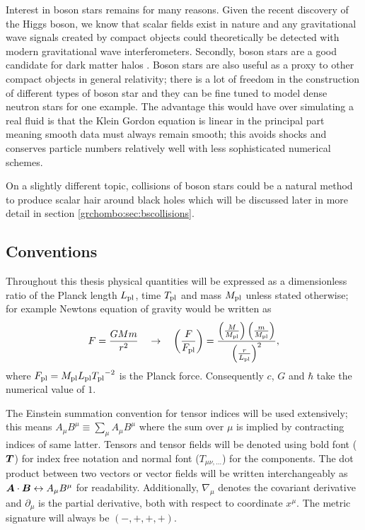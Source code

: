 Interest in boson stars remains for many reasons. Given the recent discovery of the Higgs boson, we know that scalar fields exist in nature and any gravitational wave signals created by compact objects could theoretically be detected with modern gravitational wave interferometers. Secondly, boson stars are a good candidate for dark matter halos \cite{lee1996galactic} \cite{schunck2003general}. Boson stars are also useful as a proxy to other compact objects in general relativity; there is a lot of freedom in the construction of different types of boson star and they can be fine tuned to model dense neutron stars for one example. The advantage this would have over simulating a real fluid is that the Klein Gordon equation is linear in the principal part meaning smooth data must always remain smooth; this avoids shocks and conserves particle numbers relatively well with less sophisticated numerical schemes. 

On a slightly different topic, collisions of boson stars could be a natural method to produce scalar hair around black holes which will be discussed later in more detail in section \ref{grchombo:sec:bscollisions}.

\subsection{Conventions} \label{intro:sec:conventions}
Throughout this thesis physical quantities will be expressed as a dimensionless ratio of the Planck length ${L_{\rm pl}}$, time ${T_{\rm pl}}$ and mass ${M_{\rm pl}}$ unless stated otherwise; for example Newtons equation of gravity would be written as
\begin{equation}
F=\frac{GMm}{r^2} \quad \rightarrow \quad\left(\frac{F}{{F_{\rm pl}}}\right) = \frac{\left(\frac{M}{{M_{\rm pl}}}\right)  \left(\frac{m}{{M_{\rm pl}}}\right)}{\left(\frac{r}{{L_{\rm pl}}}\right)^2},
\end{equation}
where ${F_{\rm pl}} = {M_{\rm pl}}{L_{\rm pl}}{T_{\rm pl}}^{-2}$ is the Planck force. Consequently $c$, $G$ and $\hbar$ take the numerical value of $1$.

The Einstein summation convention for tensor indices will be used extensively; this means $A_\mu B^\mu \equiv \sum_{\mu} A_\mu B^\mu$ where the sum over $\mu$ is implied by contracting indices of same latter. Tensors and tensor fields will be denoted using bold font ($\boldsymbol{T}$) for
index free notation and normal font ($T_{\mu\nu,...}$) for the components.
The dot product between two vectors or vector fields will be written interchangeably as $\boldsymbol{A} \cdot \boldsymbol{B} \leftrightarrow {A}_\mu {B}^\mu$ for readability.
Additionally, $\nabla_\mu$ denotes the covariant derivative and $\partial_\mu$
is the partial derivative, both with respect to coordinate $x^\mu$. The metric signature will always be $(-,+,+,+)$. 

